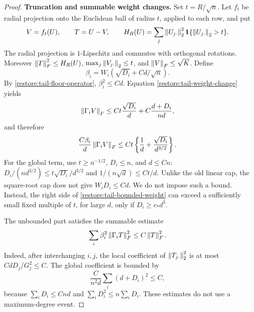 \begin{proof}
\medskip\noindent\textbf{Truncation and summable weight changes.}
Set $t=R/\sqrt n$.  Let $f_t$ be radial projection onto the Euclidean
ball of radius $t$, applied to each row, and put
\[
 V=f_t(U),\qquad T=U-V,\qquad
 H_R(U)=\sum_j\left\lVert U_{j\cdot}\right\rVert_2^2
                         \mathbf1\{\left\lVert U_{j\cdot}\right\rVert_2>t\}.
\]
The radial projection is $1$-Lipschitz and commutes with orthogonal
rotations.  Moreover $\left\lVert T\right\rVert_F^2\le H_R(U)$,
$\max_j\left\lVert V_{j\cdot}\right\rVert_2\le t$, and $\left\lVert V\right\rVert_F\le\sqrt K$.
Define
\[
 \beta_i=W_i\left(\sqrt{D_i}+Cd/\sqrt n\right).
\]
By \eqref{restore:tail-floor-operator}, $\beta_i^2\le Cd$.
Equation \eqref{restore:tail-weight-change} yields
\[
 \left\lVert\Gamma_iV\right\rVert_F
 \le Ct\frac{\sqrt{D_i}}d+C\frac{d+D_i}{nd},
\]
and therefore
\begin{equation}
 \frac{C\beta_i}d\left\lVert\Gamma_iV\right\rVert_F
 \le Ct\left\{\frac1d+\frac{\sqrt{D_i}}{d^{3/2}}\right\}.
 \label{restore:tail-bounded-weight}
\end{equation}
For the global term, use $t\ge n^{-1/2}$, $D_i\le n$, and
$d\le Cn$: $D_i/(nd^{3/2})\le t\sqrt{D_i}/d^{3/2}$ and
$1/(n\sqrt d)\le Ct/d$.
Unlike the old linear cap, the square-root cap does not give
$W_iD_i\le Cd$.  We do not impose such a bound.  Instead, the
right side of \eqref{restore:tail-bounded-weight} can exceed a
sufficiently small fixed multiple of $t$, for large $d$, only if
$D_i\ge c_*d^3$.

The unbounded part satisfies the summable estimate
\begin{equation}
 \sum_i\beta_i^2\left\lVert\Gamma_iT\right\rVert_F^2\le C\left\lVert T\right\rVert_F^2.
 \label{restore:tail-summable-weight}
\end{equation}
Indeed, after interchanging $i,j$, the local coefficient of
$\left\lVert T_{j\cdot}\right\rVert_2^2$ is at most
$CdD_j/G_j^2\le C$.
The global coefficient is bounded by
\[
 \frac{C}{n^2d}\sum_i(d+D_i)^2\le C,
\]
because $\sum_iD_i\le Cnd$ and
$\sum_iD_i^2\le n\sum_iD_i$.
These estimates do not use a maximum-degree event.


\end{proof}
